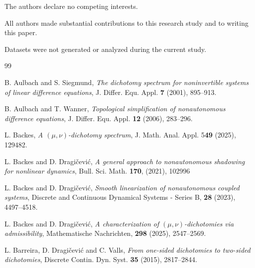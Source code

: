 \documentclass[reqno, a4paper, 10pt]{amsart}
\theoremstyle{plain}
\numberwithin{equation}{section}
\theoremstyle{remark}
\begin{document}
 The authors declare no competing interests.

All authors  made substantial contributions 
 to this research study and to writing this paper.

 Datasets were not generated or analyzed during the current study.
 


 


 
 
 
 
\begin{thebibliography}{99}

 B. Aulbach and S. Siegmund, \emph{The dichotomy spectrum for noninvertible systems of linear
difference equations}, J. Differ. Equ. Appl. \textbf{7} (2001), 895--913.

 B. Aulbach and T. Wanner, \emph{Topological simplification of nonautonomous difference equations}, J. Differ. Equ. Appl. \textbf{12} (2006), 283–296.

L. Backes, \emph{A $(\mu,\nu)$-dichotomy spectrum}, J. Math. Anal. Appl. 5\textbf{49} (2025), 129482.

 L. Backes and D. Dragi\v cevi\' c, \emph{A general approach to nonautonomous shadowing for nonlinear dynamics}, Bull. Sci. Math. \textbf{170}, (2021), 102996

 L. Backes and D. Dragi\v cevi\' c, \emph{Smooth linearization of nonautonomous coupled systems},  Discrete and Continuous Dynamical Systems - Series B, \textbf{28} (2023), 4497--4518.

 L. Backes and D. Dragi\v cevi\' c, \emph{A characterization of $(\mu,\nu)$-dichotomies via admissibility}, Mathematische Nachrichten, \textbf{298} (2025), 2547--2569.



L. Barreira, D. Dragi\v cevi\' c and C. Valls, \emph{From one-sided dichotomies to two-sided dichotomies}, Discrete Contin. Dyn. Syst. \textbf{35} (2015), 2817--2844.




\end{thebibliography}
\end{document}
